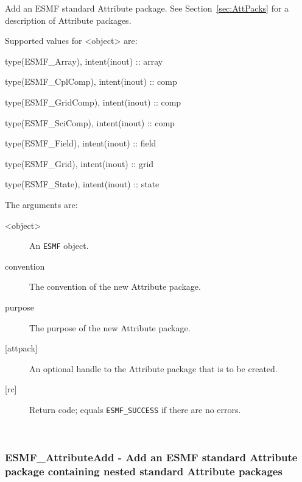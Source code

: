    Add an ESMF standard Attribute package. See Section~\ref{sec:AttPacks}
   for a description of Attribute packages.
  
   Supported values for <object> are:
   \begin{description}
   \item type(ESMF\_Array), intent(inout) :: array
   \item type(ESMF\_CplComp), intent(inout) :: comp
   \item type(ESMF\_GridComp), intent(inout) :: comp
   \item type(ESMF\_SciComp), intent(inout) :: comp
   \item type(ESMF\_Field), intent(inout) :: field
   \item type(ESMF\_Grid), intent(inout) :: grid
   \item type(ESMF\_State), intent(inout) :: state
   \end{description}
  
   The arguments are:
   \begin{description}
   \item [<object>]
   An {\tt ESMF} object.
   \item [convention]
   The convention of the new Attribute package.
   \item [purpose]
   The purpose of the new Attribute package.
   \item [{[attpack]}]
   An optional handle to the Attribute package that is to be created.
   \item [{[rc]}]
   Return code; equals {\tt ESMF\_SUCCESS} if there are no errors.
   \end{description}
  
   
 
\mbox{}\hrulefill\ 
 
\subsubsection [ESMF\_AttributeAdd] {ESMF\_AttributeAdd - Add an ESMF standard Attribute package containing nested standard Attribute packages}


